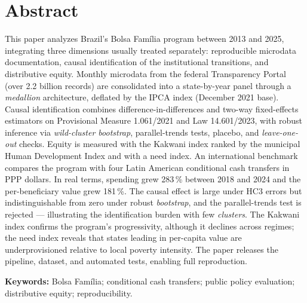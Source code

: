 \documentclass[12pt,a4paper,oneside]{article}
\begin{document}
\section*{Abstract}
\begin{singlespace}\small\noindent
This paper analyzes Brazil's Bolsa Família program between 2013 and 2025, integrating three dimensions usually treated separately: reproducible microdata documentation, causal identification of the institutional transitions, and distributive equity. Monthly microdata from the federal Transparency Portal (over 2.2 billion records) are consolidated into a state-by-year panel through a \textit{medallion} architecture, deflated by the IPCA index (December 2021 base). Causal identification combines difference-in-differences and two-way fixed-effects estimators on Provisional Measure 1.061/2021 and Law 14.601/2023, with robust inference via \textit{wild-cluster bootstrap}, parallel-trends tests, placebo, and \textit{leave-one-out} checks. Equity is measured with the Kakwani index ranked by the municipal Human Development Index and with a need index. An international benchmark compares the program with four Latin American conditional cash transfers in PPP dollars. In real terms, spending grew 283\,\% between 2018 and 2024 and the per-beneficiary value grew 181\,\%. The causal effect is large under HC3 errors but indistinguishable from zero under robust \textit{bootstrap}, and the parallel-trends test is rejected --- illustrating the identification burden with few \textit{clusters}. The Kakwani index confirms the program's progressivity, although it declines across regimes; the need index reveals that states leading in per-capita value are underprovisioned relative to local poverty intensity. The paper releases the pipeline, dataset, and automated tests, enabling full reproduction.

\vspace{6pt}\noindent\textbf{Keywords:} Bolsa Família; conditional cash transfers; public policy evaluation; distributive equity; reproducibility.
\end{singlespace}

\vspace{6pt}
\end{document}

